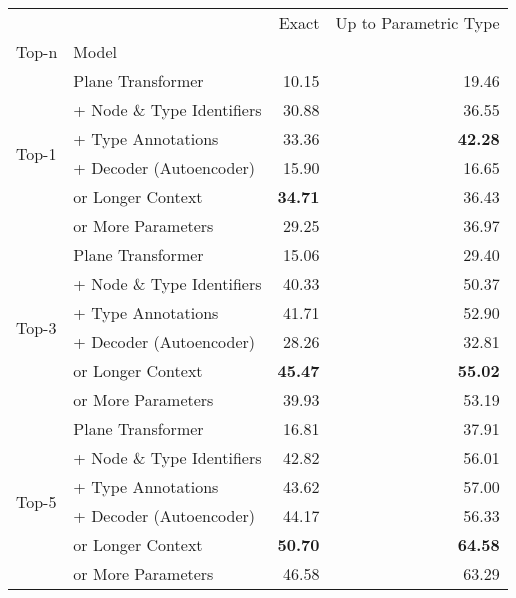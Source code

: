 \begin{tabular}{llrr}
\toprule
 &  & Exact & Up to Parametric Type \\
Top-n & Model &  &  \\
\midrule
\multirow[c]{6}{*}{Top-1} & Plane Transformer & 10.15 & 19.46 \\
 & + Node \& Type Identifiers & 30.88 & 36.55 \\
 & + Type Annotations & 33.36 & \bfseries 42.28 \\
 & + Decoder (Autoencoder) & 15.90 & 16.65 \\
 & or Longer Context & \bfseries 34.71 & 36.43 \\
 & or More Parameters & 29.25 & 36.97 \\
\cline{1-4}
\multirow[c]{6}{*}{Top-3} & Plane Transformer & 15.06 & 29.40 \\
 & + Node \& Type Identifiers & 40.33 & 50.37 \\
 & + Type Annotations & 41.71 & 52.90 \\
 & + Decoder (Autoencoder) & 28.26 & 32.81 \\
 & or Longer Context & \bfseries 45.47 & \bfseries 55.02 \\
 & or More Parameters & 39.93 & 53.19 \\
\cline{1-4}
\multirow[c]{6}{*}{Top-5} & Plane Transformer & 16.81 & 37.91 \\
 & + Node \& Type Identifiers & 42.82 & 56.01 \\
 & + Type Annotations & 43.62 & 57.00 \\
 & + Decoder (Autoencoder) & 44.17 & 56.33 \\
 & or Longer Context & \bfseries 50.70 & \bfseries 64.58 \\
 & or More Parameters & 46.58 & 63.29 \\
\cline{1-4}
\bottomrule
\end{tabular}

